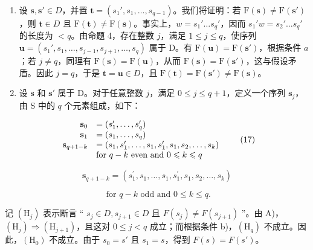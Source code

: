 \begin{enumerate}
\def\labelenumi{\Alph{enumi})}
\item
  设 \(\mathbf{s}, \mathbf{s}' \in D\)，并置 \(\mathbf{t} = (s_1', s_1, \ldots, s_{q-1})\)。我们将证明：若 \(\mathrm{F}(\mathbf{s}) \neq \mathrm{F}(\mathbf{s}')\)，则 \(\mathbf{t} \in D\) 且 \(\mathrm{F}(\mathbf{t}) \neq \mathrm{F}(\mathbf{s})\)。事实上，\(w = s_1' \ldots s_q'\)，因而 \(s_1' w = s_2' \ldots s_q'\) 的长度为 \(< q\)。由命题 4，存在整数 \(j\)，满足 \(1 \leqslant j \leqslant q\)，使序列 \(\mathbf{u} = (s_1', s_1, \ldots, s_{j-1}, s_{j+1}, \ldots, s_q)\) 属于 D。有 \(\mathrm{F}(\mathbf{u}) = \mathrm{F}(\mathbf{s}')\)，根据条件 \(a\)；若 \(j \neq q\)，同理有 \(\mathrm{F}(\mathbf{s}) = \mathrm{F}(\mathbf{u})\)，从而 \(\mathrm{F}(\mathbf{s}) = \mathrm{F}(\mathbf{s}')\)，这与假设矛盾。因此 \(j = q\)，于是 \(\mathbf{t} = \mathbf{u} \in D\)，且 \(\mathrm{F}(\mathbf{t}) = \mathrm{F}(\mathbf{s}') \neq \mathrm{F}(\mathbf{s})\)。
\item
  设 \(\mathbf{s}\) 和 \(\mathbf{s}'\) 属于 D。对于任意整数 \(j\)，满足 \(0 \leqslant j \leqslant q + 1\)，定义一个序列 \(\mathbf{s}_j\)，由 S 中的 \(q\) 个元素组成，如下：
\end{enumerate}

\[
\begin{array}{r l} \mathbf {s} _ {0} & = (s _ {1} ^ {\prime}, \dots , s _ {q} ^ {\prime}) \\ \mathbf {s} _ {1} & = (s _ {1}, \dots , s _ {q}) \\ \mathbf {s} _ {q + 1 - k} & = (s _ {1}, s _ {1} ^ {\prime}, \dots , s _ {1}, s _ {1} ^ {\prime}, s _ {1}, s _ {2}, \dots , s _ {k}) \\ & \text {for } q - k \text { even and } 0 \leqslant k \leqslant q \end{array}\tag{17}
\]

\[
\mathbf {s} _ {q + 1 - k} = \left(s _ {1} ^ {\prime}, s _ {1}, \ldots , s _ {1}, s _ {1} ^ {\prime}, s _ {1}, s _ {2}, \ldots , s _ {k}\right)
\]

\[
\text { for   } q - k \text {   odd   and   } 0 \leqslant k \leqslant q.
\]

记 \((\mathrm{H}_{j})\) 表示断言 `` \(s_{j} \in D, s_{j+1} \in D\) 且 \(F(s_{j}) \neq F(s_{j+1})\) ''。由 A)，\((\mathrm{H}_{j}) \Longrightarrow (\mathrm{H}_{j+1})\)，且这对 \(0 \leqslant j < q\) 成立；而根据条件 b)，\((\mathrm{H}_{q})\) 不成立。因此，\((\mathrm{H}_{0})\) 不成立。由于 \(s_{0} = s'\) 且 \(s_{1} = s\)，得到 \(F(s) = F(s')\)。

